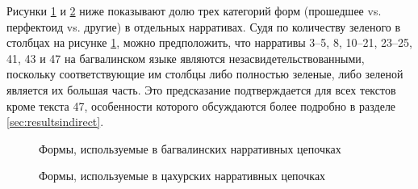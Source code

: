 Рисунки \ref{fig:bagvnar} и \ref{fig:tsakhnar} ниже показывают долю трех категорий форм (прошедшее vs. перфектоид vs. другие) в отдельных нарративах. Судя по количеству зеленого в столбцах на рисунке \ref{fig:bagvnar}, можно предположить, что нарративы 3--5, 8, 10--21, 23--25, 41, 43 и 47 на багвалинском языке являются незасвидетельствованными, поскольку соответствующие им столбцы либо полностью зеленые, либо зеленой является их большая часть. Это предсказание подтверждается для всех текстов кроме текста 47, особенности которого обсуждаются более подробно в разделе \ref{sec:resultsindirect}.

\begin{figure}[H]
\centering
\caption{Формы, используемые в багвалинских нарративных цепочках}
\label{fig:bagvnar}
\vspace{0.5cm}
\end{figure}

\begin{figure}[H]
\centering
\caption{Формы, используемые в цахурских нарративных цепочках}
\label{fig:tsakhnar}
\vspace{0.5cm}
\end{figure}

